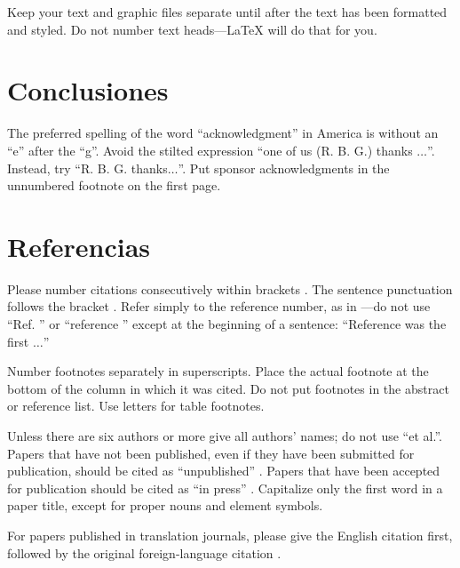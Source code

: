 \documentclass[conference]{IEEEtran}
\begin{document}
Keep your text and graphic files separate until after the text has been 
formatted and styled. Do not number text heads---{\LaTeX} will do that 
for you.

\section*{Conclusiones}

The preferred spelling of the word ``acknowledgment'' in America is without 
an ``e'' after the ``g''. Avoid the stilted expression ``one of us (R. B. 
G.) thanks $\ldots$''. Instead, try ``R. B. G. thanks$\ldots$''. Put sponsor 
acknowledgments in the unnumbered footnote on the first page.

\section*{Referencias}

Please number citations consecutively within brackets \cite{b1}. The 
sentence punctuation follows the bracket \cite{b2}. Refer simply to the reference 
number, as in \cite{b3}---do not use ``Ref. \cite{b3}'' or ``reference \cite{b3}'' except at 
the beginning of a sentence: ``Reference \cite{b3} was the first $\ldots$''

Number footnotes separately in superscripts. Place the actual footnote at 
the bottom of the column in which it was cited. Do not put footnotes in the 
abstract or reference list. Use letters for table footnotes.

Unless there are six authors or more give all authors' names; do not use 
``et al.''. Papers that have not been published, even if they have been 
submitted for publication, should be cited as ``unpublished'' \cite{b4}. Papers 
that have been accepted for publication should be cited as ``in press'' \cite{b5}. 
Capitalize only the first word in a paper title, except for proper nouns and 
element symbols.

For papers published in translation journals, please give the English 
citation first, followed by the original foreign-language citation \cite{b6}.
\end{document}
